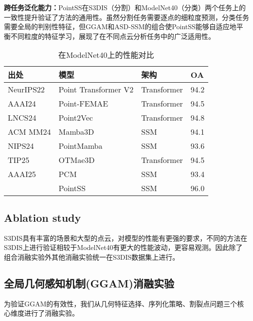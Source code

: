 \documentclass[preprint,12pt]{elsarticle}
\begin{document}
\textbf{跨任务泛化能力：}PointSS在S3DIS（分割）和ModelNet40（分类）两个任务上的一致性提升验证了方法的通用性。虽然分割任务需要逐点的细粒度预测，分类任务需要全局的判别性特征，但GGAM和ASD-SSM的组合使PointSS能够自适应地平衡不同粒度的特征学习，展现了在不同点云分析任务中的广泛适用性。

\begin{table}[htbp!]
	\centering
	\caption{在ModelNet40上的性能对比}
	\label{tab:ModelNet}
	\begin{tabular}{@{}llll@{}}
		\toprule
		\textbf{出处}  & \textbf{模型}           & \textbf{架构} & \textbf{OA} \\ \midrule
		NeurIPS22 & Point Transformer V2\cite{ptv2}  & Transformer & 94.2          \\
		AAAI24    & Point-FEMAE\cite{FEMAE}        & Transformer & 94.5             \\
		LNCS24      & Point2Vec\cite{Point2Vec}      & Transformer & 94.8          \\
		ACM MM24     & Mamba3D\cite{Mamba3D}              & SSM & 94.1          \\
		NIPS24    & PointMamba\cite{PointMamba}   & SSM         & 93.6         \\
		TIP25     & OTMae3D\cite{OTMae3D}    & Transformer & 94.5          \\
		AAAI25    & PCM\cite{pcm}     & SSM         & 93.4         \\
		& PointSS               &SSM             & 96.0          \\ \bottomrule
	\end{tabular}
\end{table}







\subsection{Ablation study}
S3DIS具有丰富的场景和大型的点云，对模型的性能有更强的要求，不同的方法在S3DIS上进行验证相较于ModelNet40有更大的性能波动，更容易观测。因此除了组合消融实验外其他消融实验统一在S3DIS数据集上进行。

\label{subsec:Ablation}


\subsection{全局几何感知机制(GGAM)消融实验}
为验证GGAM的有效性，我们从几何特征选择、序列化策略、割裂点问题三个核心维度进行了消融实验。
\end{document}
